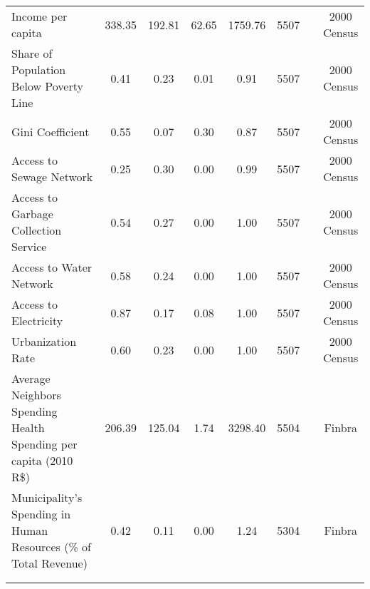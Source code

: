 \begin{table}[H]
\begin{footnotesize}
\begin{center}
{\begin{threeparttable}[b]
\begin{tabular}{rrrrrrrr}
    \multicolumn{1}{l}{Income per capita} & \multicolumn{1}{c}{338.35} & \multicolumn{1}{c}{192.81} & \multicolumn{1}{c}{62.65} & \multicolumn{1}{c}{1759.76} & \multicolumn{1}{c}{5507} &       & \multicolumn{1}{c}{2000 Census} \\
    \multicolumn{1}{l}{Share of Population Below Poverty Line} & \multicolumn{1}{c}{0.41} & \multicolumn{1}{c}{0.23} & \multicolumn{1}{c}{0.01} & \multicolumn{1}{c}{0.91} & \multicolumn{1}{c}{5507} &       & \multicolumn{1}{c}{2000 Census} \\
    \multicolumn{1}{l}{Gini Coefficient} & \multicolumn{1}{c}{0.55} & \multicolumn{1}{c}{0.07} & \multicolumn{1}{c}{0.30} & \multicolumn{1}{c}{0.87} & \multicolumn{1}{c}{5507} &       & \multicolumn{1}{c}{2000 Census} \\
    \multicolumn{1}{l}{Access to Sewage Network} & \multicolumn{1}{c}{0.25} & \multicolumn{1}{c}{0.30} & \multicolumn{1}{c}{0.00} & \multicolumn{1}{c}{0.99} & \multicolumn{1}{c}{5507} &       & \multicolumn{1}{c}{2000 Census} \\
    \multicolumn{1}{l}{Access to Garbage Collection Service} & \multicolumn{1}{c}{0.54} & \multicolumn{1}{c}{0.27} & \multicolumn{1}{c}{0.00} & \multicolumn{1}{c}{1.00} & \multicolumn{1}{c}{5507} &       & \multicolumn{1}{c}{2000 Census} \\
    \multicolumn{1}{l}{Access to Water Network} & \multicolumn{1}{c}{0.58} & \multicolumn{1}{c}{0.24} & \multicolumn{1}{c}{0.00} & \multicolumn{1}{c}{1.00} & \multicolumn{1}{c}{5507} &       & \multicolumn{1}{c}{2000 Census} \\
    \multicolumn{1}{l}{Access to Electricity} & \multicolumn{1}{c}{0.87} & \multicolumn{1}{c}{0.17} & \multicolumn{1}{c}{0.08} & \multicolumn{1}{c}{1.00} & \multicolumn{1}{c}{5507} &       & \multicolumn{1}{c}{2000 Census} \\
    \multicolumn{1}{l}{Urbanization Rate} & \multicolumn{1}{c}{0.60} & \multicolumn{1}{c}{0.23} & \multicolumn{1}{c}{0.00} & \multicolumn{1}{c}{1.00} & \multicolumn{1}{c}{5507} &       & \multicolumn{1}{c}{2000 Census} \\
    \multicolumn{1}{l}{Average Neighbors Spending Health Spending per capita (2010 R\$)} & \multicolumn{1}{c}{206.39} & \multicolumn{1}{c}{125.04} & \multicolumn{1}{c}{1.74} & \multicolumn{1}{c}{3298.40} & \multicolumn{1}{c}{5504} &       & \multicolumn{1}{c}{Finbra} \\
    \multicolumn{1}{l}{Municipality's Spending in Human Resources (\% of Total Revenue)} & \multicolumn{1}{c}{0.42} & \multicolumn{1}{c}{0.11} & \multicolumn{1}{c}{0.00} & \multicolumn{1}{c}{1.24} & \multicolumn{1}{c}{5304} &       & \multicolumn{1}{c}{Finbra} \\
          &       &       &       &       &       &       &  \\
    \midrule
    \midrule
          &       &       &       &       &       &       &  \\
    \end{tabular}%
    




\end{threeparttable}}
\end{center}
\end{footnotesize}
\end{table}
